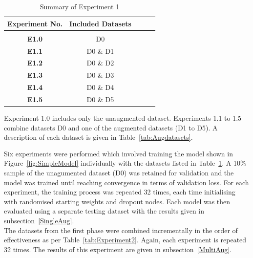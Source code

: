 \begin{table}[h!]
	 \begin{center}
		
		\begin{tabular}{c|c|c|r|c} %
			\textbf{Experiment No.} & \textbf{Included Datasets}  \\
			
			\hline
			& \\
			\textbf{E1.0} &  D0 \\
			\textbf{E1.1} & D0 \& D1 \\ 
			\textbf{E1.2} & D0 \& D2 \\
			\textbf{E1.3} & D0 \& D3 \\
			\textbf{E1.4} & D0 \& D4 \\
			\textbf{E1.5} & D0 \& D5 \\ 
			
		\end{tabular}
		\caption{Summary of Experiment 1} {Experiment 1.0 includes only the unaugmented dataset. Experiments 1.1 to 1.5 combine datasets D0 and one of the augmented datasets (D1 to D5). A description of each dataset is given in Table~\ref{tab:Augdatasets}.}
		\label{tab:Experiment1}
		 \end{center}
\end{table}

\noindent
Six experiments were performed which involved training the model shown in Figure~\ref{fig:SimpleModel} individually with the datasets listed in Table~\ref{tab:Experiment1}. A 10\% sample of the unagumented dataset (D0) was retained for validation and the model was trained until reaching convergence in terms of validation loss. For each experiment, the training process was repeated 32 times, each time initialising with randomised starting weights and dropout nodes. Each model was then evaluated using a separate testing dataset with the results given in subsection~\ref{SingleAug}.
\\

\noindent
The datasets from the first phase were combined incrementally in the order of effectiveness as per Table~\ref{tab:Experiment2}. Again, each experiment is repeated 32 times. The results of this experiment are given in subsection~\ref{MultiAug}. 

